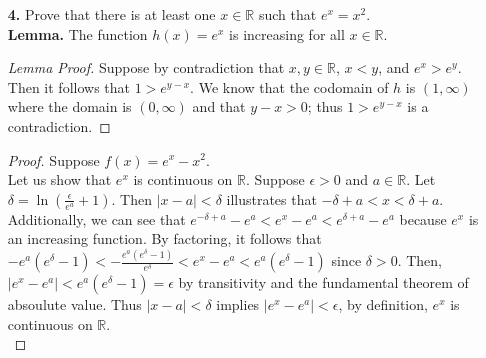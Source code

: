 \documentclass[ 12pt ]{article}
\begin{document}
\begin{enumerate}
	\begin{proof}
		Suppose $A \subseteq \mathbb{R}$, $A \neq \emptyset$, and that $f,g: A \rightarrow \mathbb{R}$ are both uniformly continuous on $A$. Further suppose $\epsilon > 0$
		and $x, a \in A$. Let $\delta = \min \{ \delta_1, \delta_2 \}$ where $\delta_1$ and $\delta_2$ exist to show that $f$ and $g$ have uniform continuity on $A$
		respectively. Moreover, $\delta = \min \{ \delta_1, \delta_2 \}$ should suffice so that $|x - a| < \delta$ implies both $|f(x) - f(a)| < \frac{\epsilon}{2}$ and
		$|g(x) - g(a)| < \frac{\epsilon}{2}$ for all $\epsilon > 0$ and $x, a \in A$. If this were not true, then it would contradict the uniform continuity of either $f$
		or $g$ on $A$ since we are maintaining or lessening $\delta_1$ and $\delta_2$ for both $f$ and $g$. Then it follows that $\left | (f(x) + g(x)) - (f(a) + g(a)) \right | \leq
		|f(x) - f(a)| + |g(x) - g(a)| < \frac{\epsilon}{2} + \frac{\epsilon}{2} = \epsilon$. Thus $\left | (f(x) + g(x)) - (f(a) + g(a)) \right | < \epsilon$ for all
		$\epsilon > 0$ and $x, a \in A$. By definition $f + g$ is uniformly continuous on A.
	\end{proof}


	\item[\textbf{4.}] Prove that there is at least one $x \in \mathbb{R}$ such that $e^x = x^2$. \\

	\textbf{Lemma.} The function $h(x) = e^x$ is increasing for all $x \in \mathbb{R}$.

	\begin{proof}[Lemma Proof]
		Suppose by contradiction that $x,y \in \mathbb{R}$, $x < y$, and $e^x > e^y$. Then it follows that $1 > e^{y-x}$. We know that the codomain of $h$ is $(1, \infty)$
		where the domain is $(0, \infty)$ and that $y - x > 0$; thus $1 > e^{y-x}$ is a contradiction.
	\end{proof}

	\begin{proof}
		Suppose $f(x) = e^x - x^2$. \\
		
		Let us show that $e^x$ is continuous on $\mathbb{R}$. Suppose $\epsilon > 0$ and $a \in \mathbb{R}$. Let $\delta = \ln ( \frac{\epsilon}{e^a} + 1 )$.
		Then $|x - a| < \delta$ illustrates that $-\delta + a < x < \delta + a$. Additionally, we can see that $e^{-\delta + a} - e^a < e^x - e^a < e^{\delta + a} - e^a$ because $e^x$ is an increasing function.
		By factoring, it follows that $-e^a(e^\delta - 1) < -\frac{e^a(e^\delta - 1)}{e^\delta} < e^x - e^a < e^a(e^\delta - 1)$ since $\delta > 0$. Then, $|e^x - e^a| < e^a(e^\delta - 1) = \epsilon$ by transitivity and the fundamental theorem of absoulute value.
		Thus $|x - a| < \delta$ implies $|e^x - e^a| < \epsilon$, by definition, $e^x$ is continuous on $\mathbb{R}$. \\


\end{proof}
\end{enumerate}
\end{document}
